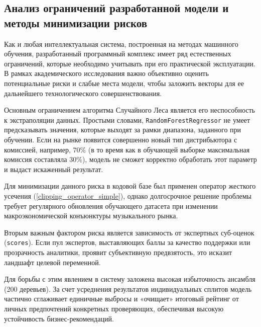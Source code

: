 \documentclass[14pt, a4paper]{extarticle}
\begin{document}
\subsection{Анализ ограничений разработанной модели и методы минимизации рисков}
Как и любая интеллектуальная система, построенная на методах машинного обучения, разработанный программный комплекс имеет ряд естественных ограничений, которые необходимо учитывать при его практической эксплуатации. В рамках академического исследования важно объективно оценить потенциальные риски и слабые места модели, чтобы заложить векторы для ее дальнейшего технологического совершенствования.

Основным ограничением алгоритма Случайного Леса является его неспособность к экстраполяции данных. Простыми словами, \texttt{RandomForestRegressor} не умеет предсказывать значения, которые выходят за рамки диапазона, заданного при обучении. Если на рынке появится совершенно новый тип дистрибьютора с комиссией, например, $70\%$ (в то время как в обучающей выборке максимальная комиссия составляла $30\%$), модель не сможет корректно обработать этот параметр и выдаст искаженный результат. 

Для минимизации данного риска в кодовой базе был применен оператор жесткого усечения (\ref{clipping_operator_simple}), однако долгосрочное решение проблемы требует регулярного обновления обучающего датасета при изменении макроэкономической конъюнктуры музыкального рынка.

Вторым важным фактором риска является зависимость от экспертных суб-оценок (\texttt{scores}). Если пул экспертов, выставляющих баллы за качество поддержки или прозрачность аналитики, проявит субъективную предвзятость, это исказит ландшафт целевой переменной. 

Для борьбы с этим явлением в систему заложена высокая избыточность ансамбля (200 деревьев). За счет усреднения результатов индивидуальных сплитов модель частично сглаживает единичные выбросы и «очищает» итоговый рейтинг от личных предпочтений конкретных проверяющих, обеспечивая высокую устойчивость бизнес-рекомендаций.
\end{document}
